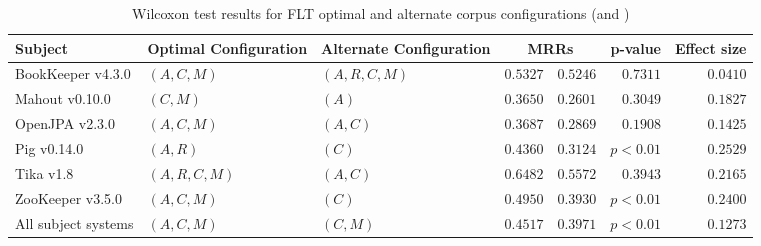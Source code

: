 \begin{landscape}

\begin{table}
\begin{spacing}{1.2}
\centering
\caption{Wilcoxon test results for FLT optimal and alternate corpus configurations (\cone and \ctwo)}
\label{table:combo-flt-corpus-sweep-wilcox}
\begin{tabular}{lllrrrr}
\toprule
                      Subject & Optimal Configuration & Alternate Configuration & \multicolumn{2}{c}{MRRs}  &  p-value & Effect size \\
\midrule
            BookKeeper v4.3.0 &           $(A, C, M)$ &          $(A, R, C, M)$ &    $0.5327$ &      $0.5246$ & $0.7311$ &    $0.0410$ \\
               Mahout v0.10.0 &              $(C, M)$ &                   $(A)$ &    $0.3650$ &      $0.2601$ & $0.3049$ &    $0.1827$ \\
               OpenJPA v2.3.0 &           $(A, C, M)$ &                $(A, C)$ &    $0.3687$ &      $0.2869$ & $0.1908$ &    $0.1425$ \\
                  Pig v0.14.0 &              $(A, R)$ &                   $(C)$ &    $0.4360$ &      $0.3124$ & $p<0.01$ &    $0.2529$ \\
                    Tika v1.8 &        $(A, R, C, M)$ &                $(A, C)$ &    $0.6482$ &      $0.5572$ & $0.3943$ &    $0.2165$ \\
             ZooKeeper v3.5.0 &           $(A, C, M)$ &                   $(C)$ &    $0.4950$ &      $0.3930$ & $p<0.01$ &    $0.2400$ \\
 \midrule
All subject systems &           $(A, C, M)$ &                $(C, M)$ &    $0.4517$ &      $0.3971$ & $p<0.01$ &    $0.1273$ \\
\bottomrule
\end{tabular}

\end{spacing}
\end{table}



\end{landscape}
